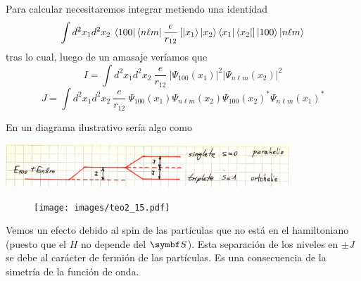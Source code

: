 \documentclass[10pt,oneside]{CBFT_book}
\begin{document}
Para calcular necesitaremos integrar metiendo una identidad
\[
	\int d^2x_1 d^2x_2 \: \Bra{100}\Bra{n\ell m}\frac{e}{r_{12}} \left[ 
	\Ket{x_1}\Ket{x_2} \Bra{x_1}\Bra{x_2}
	\right] \Ket{100}\Ket{n\ell m}
\]
tras lo cual, luego de un amasaje veríamos que
\[
	I = \int d^2x_1 d^2x_2 \: \frac{e}{r_{12}} \:
	|\Psi_{100}(x_1)|^2 |\Psi_{n\ell m}(x_2)|^2
\]
\[
	J = \int d^2x_1 d^2x_2 \: \frac{e}{r_{12}} \: 
	\Psi_{100}(x_1) \Psi_{n\ell m}(x_2) \Psi_{100}(x_2)^* \Psi_{n\ell m}(x_1)^*
\]

En un diagrama ilustrativo sería algo como

\includegraphics[width=0.8\textwidth]{images/fig_ft2_extra_identical2.jpg}

\begin{figure}[htb]
	\begin{center}
	\texttt{[image: images/teo2\_15.pdf]}
	\end{center}
	\caption{}
\end{figure} 

Vemos un efecto debido al spin de las partículas que no está en el hamiltoniano (puesto que
el $H$ no depende del $\vb S$).
Esta separación de los niveles en $\pm J$ se debe al carácter de fermión de las partículas.
Es una consecuencia de la simetría de la función de onda.
\end{document}
